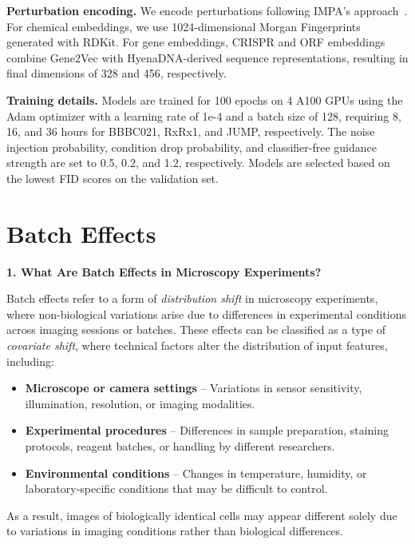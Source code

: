 \textbf{Perturbation encoding.} We encode perturbations following IMPA’s approach~\cite{palma2023predicting}. For chemical embeddings, we use 1024-dimensional Morgan Fingerprints generated with RDKit. For gene embeddings, CRISPR and ORF embeddings combine Gene2Vec with HyenaDNA-derived sequence representations, resulting in final dimensions of 328 and 456, respectively.

\textbf{Training details.} Models are trained for 100 epochs on 4 A100 GPUs using the Adam optimizer with a learning rate of 1e-4 and a batch size of 128, requiring 8, 16, and 36 hours for BBBC021, RxRx1, and JUMP, respectively. The noise injection probability, condition drop probability, and classifier-free guidance strength are set to 0.5, 0.2, and 1.2, respectively. Models are selected based on the lowest FID scores on the validation set.


\newpage
\section{Batch Effects}
\label{sec:batch_effect}

\textbf{1. What Are Batch Effects in Microscopy Experiments?}  

Batch effects refer to a form of \textit{distribution shift} in microscopy experiments, where non-biological variations arise due to differences in experimental conditions across imaging sessions or batches. These effects can be classified as a type of \textit{covariate shift}, where technical factors alter the distribution of input features, including:

\begin{itemize}[itemsep=0pt, parsep=0pt, topsep=0pt]
    \item \textbf{Microscope or camera settings} – Variations in sensor sensitivity, illumination, resolution, or imaging modalities.
    \item \textbf{Experimental procedures} – Differences in sample preparation, staining protocols, reagent batches, or handling by different researchers.
    \item \textbf{Environmental conditions} – Changes in temperature, humidity, or laboratory-specific conditions that may be difficult to control.
\end{itemize}

As a result, images of biologically identical cells may appear different solely due to variations in imaging conditions rather than biological differences.

